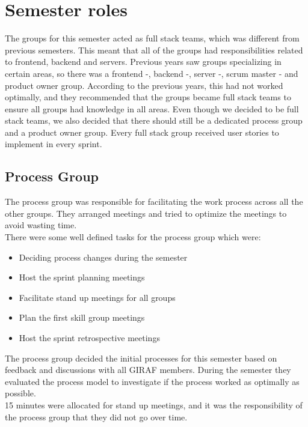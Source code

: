 \section{Semester roles}
The groups for this semester acted as full stack teams, which was different from previous semesters. 
This meant that all of the groups had responsibilities related to frontend, backend and servers.
Previous years saw groups specializing in certain areas, so there was a frontend -, backend -, server -, scrum master - and product owner group. 
According to the previous years, this had not worked optimally, and they recommended that the groups became full stack teams to ensure all groups had knowledge in all areas.
Even though we decided to be full stack teams, we also decided that there should still be a dedicated process group and a product owner group. 
Every full stack group received user stories to implement in every sprint.

\subsection{Process Group}
The process group was responsible for facilitating the work process across all the other groups.
They arranged meetings and tried to optimize the meetings to avoid wasting time.
\\
There were some well defined tasks for the process group which were:
\begin{itemize}
    \item Deciding process changes during the semester
    \item Host the sprint planning meetings
    \item Facilitate stand up meetings for all groups
    \item Plan the first skill group meetings
    \item Host the sprint retrospective meetings
\end{itemize}
\noindent
The process group decided the initial processes for this semester based on feedback and discussions with all GIRAF members.
During the semester they evaluated the process model to investigate if the process worked as optimally as possible.
\\
15 minutes were allocated for stand up meetings, and it was the responsibility of the process group that they did not go over time.

